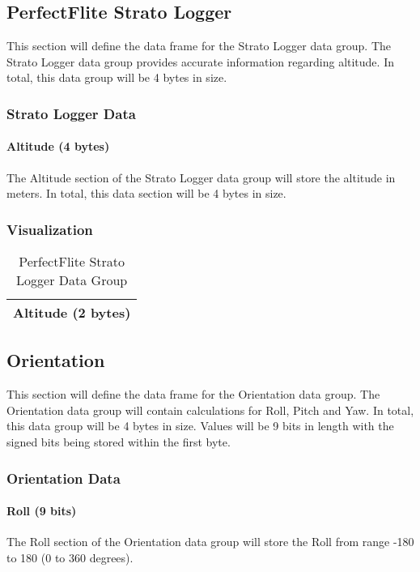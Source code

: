 \documentclass{article}
\begin{document}
 \pagebreak
 
  \subsection{PerfectFlite Strato Logger}
  This section will define the data frame for the Strato Logger data group. The Strato Logger data group provides accurate information regarding altitude. In total, this data group will be 4 bytes in size.
  \subsubsection{Strato Logger Data}
  \paragraph{Altitude (4 bytes)}
  The Altitude section of the Strato Logger data group will store the altitude in meters. In total, this data section will be 4 bytes in size.
  
  \subsubsection{Visualization}
  \begin{table}[H]
  \centering
  \caption{PerfectFlite Strato Logger Data Group}
  \label{my-label}
  \begin{tabular}{|l|}
  \hline
Altitude (2 bytes) \\ \hline
 \end{tabular}
 \end{table}
  
 \pagebreak
  
  \subsection{Orientation}
  This section will define the data frame for the Orientation data group. The Orientation data group will contain calculations for Roll, Pitch and Yaw. In total, this data group will be 4 bytes in size. Values will be 9 bits in length with the signed bits being stored within the first byte. 
  \subsubsection{Orientation Data}
  \paragraph{Roll (9 bits)}
  The Roll section of the Orientation data group will store the Roll from range -180 to 180 (0 to 360 degrees).
\end{document}
